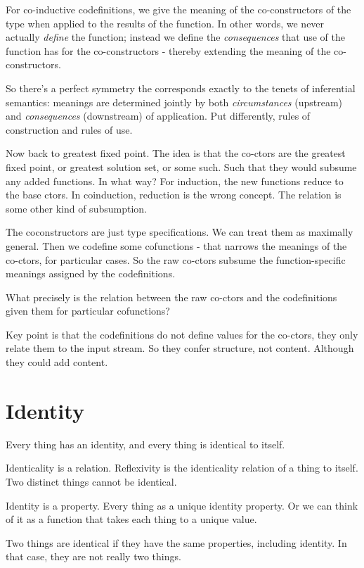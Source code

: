 \documentclass{article}
\begin{document}
For co-inductive codefinitions, we give the meaning of the
co-constructors of the type when applied to the results of the
function. In other words, we never actually \textit{define} the
function; instead we define the \textit{consequences} that use of the
function has for the co-constructors - thereby extending the meaning
of the co-constructors.

So there's a perfect symmetry the corresponds exactly to the tenets of
inferential semantics: meanings are determined jointly by both
\textit{circumstances} (upstream) and \textit{consequences}
(downstream) of application. Put differently, rules of construction
and rules of use.

Now back to greatest fixed point. The idea is that the co-ctors are
the greatest fixed point, or greatest solution set, or some such. Such
that they would subsume any added functions. In what way? For
induction, the new functions reduce to the base ctors. In coinduction,
reduction is the wrong concept. The relation is some other kind of
subsumption.

The coconstructors are just type specifications. We can treat them as
maximally general. Then we codefine some cofunctions - that narrows
the meanings of the co-ctors, for particular cases. So the raw
co-ctors subsume the function-specific meanings assigned by the
codefinitions.

What precisely is the relation between the raw co-ctors and the
codefinitions given them for particular cofunctions?

Key point is that the codefinitions do not define values for the
co-ctors, they only relate them to the input stream. So they confer
structure, not content.  Although they could add content.

\section{Identity}
Every thing has an identity, and every thing is identical to itself.

Identicality is a relation. Reflexivity is the identicality relation
of a thing to itself. Two distinct things cannot be identical.

Identity is a property. Every thing as a unique identity property. Or
we can think of it as a function that takes each thing to a unique
value.

Two things are identical if they have the same properties, including
identity. In that case, they are not really two things.
\end{document}
